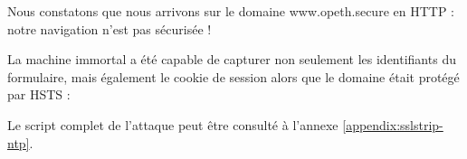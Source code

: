 Nous constatons que nous arrivons sur le domaine www.opeth.secure en HTTP : notre navigation n'est pas sécurisée !

\begin{figure}[H]
\end{figure}

La machine immortal a été capable de capturer non seulement les identifiants du formulaire, mais également le cookie de session alors que le domaine était protégé par HSTS :

\begin{figure}[H]
\end{figure}

Le script complet de l'attaque peut être consulté à l'annexe \ref{appendix:sslstrip-ntp}.
